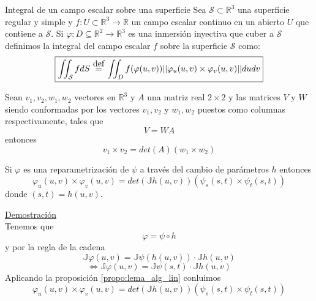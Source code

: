\documentclass{report}
\newcommand\defeq{\stackrel{\mathclap{\normalfont\mbox{def}}}{~=~}}
\newcommand\reals{\mathds{R}}
\begin{document}
\begin{defbox}{Integral de un campo escalar sobre una superficie}
	Sea $\mathcal{S} \subset \reals^3$ una superficie regular y simple y $f : U \subset \reals^3 \rightarrow \reals$ un campo escalar continuo en un abierto $U$ que contiene a $\mathcal{S}$. Si $\varphi : D \subseteq \reals^2 \rightarrow \reals^3$ es una inmersión inyectiva que cuber a $\mathcal{S}$ definimos la integral del campo escalar $f$ sobre la superficie $\mathcal{S}$ como:
	\begin{equation}
		\boxed{
			\iint_{\mathcal{S}}{fdS} \defeq \iint_{D}{f(\varphi (u, v))||\varphi_u (u,v) \times \varphi_v (u,v)||dudv}
		}
		\label{eq:int_s_f}
	\end{equation}
\end{defbox}

\begin{propobox}[label=propo:lema_alg_lin]
	Sean $v_1, v_2, w_1, w_2$ vectores en $\reals^3$ y $A$ una matriz real $2\times 2$ y las matrices $V$ y $W$ siendo conformadas por los vectores $v_1, v_2$ y $w_1, w_2$ puestos como columnas respectivamente, tales que \\
	\[
		V = WA
	\]
	entonces
	\[
		v_1 \times v_2 = det(A) (w_1 \times w_2)
	\]
\end{propobox}

\begin{propobox}
	Si $\varphi$ es una reparametrización de $\psi$ a través del cambio de parámetros $h$ entonces
	\[
		\varphi_u (u,v) \times \varphi_v (u,v) = det(\mathds{J}h(u,v)) (\psi_s (s,t) \times \psi_t (s,t))
	\]
	donde $(s,t) = h(u,v)$.
\end{propobox}
\underline{Demostración} \\
Tenemos que \\
\[
	\varphi = \psi \circ h
\]
y por la regla de la cadena
\[
	\mathds{J}\varphi (u,v) = \mathds{J}\psi (h (u,v) ) \cdot \mathds{J}h(u,v)
\]
\[
	\iff \mathds{J}\varphi (u,v) = \mathds{J}\psi (s,t) \cdot \mathds{J}h(u,v)
\]
Aplicando la proposición \ref{propo:lema_alg_lin} conluimos \\
\[
	\varphi_u (u,v) \times \varphi_v (u,v) = det(\mathds{J}h(u,v)) (\psi_s (s,t) \times \psi_t (s,t))
\]
\end{document}

